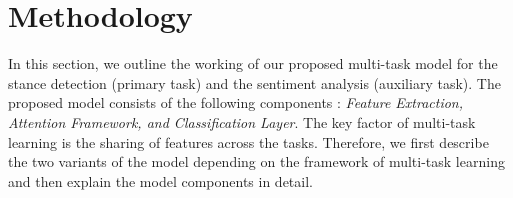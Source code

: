 \documentclass[letterpaper]{article}
\begin{document}
\section{Methodology}\label{Methodology}
In this section, we outline the working of our proposed multi-task model for the stance detection (primary task) and the sentiment analysis (auxiliary task). The proposed model consists of the following  components : \textit{Feature Extraction, Attention Framework, and Classification Layer}. %
The key factor of multi-task learning is the sharing of features across the tasks. Therefore, we first describe the two variants of the model depending on the framework of multi-task learning and then explain the model components in detail.
\end{document}

